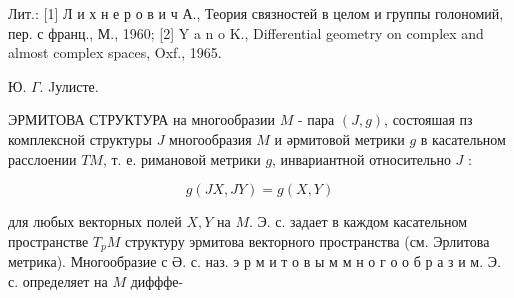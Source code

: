 \documentclass[10pt]{article}
\begin{document}
Лит.: [1] Л и х н е р о в и ч А., Теория связностей в целом и группы голономий, пер. с франц., М., 1960; [2] Y a n o K., Differential geometry on complex and almost complex spaces, Oxf., 1965.

Ю. $\Gamma$. Jулисте.



ЭРМИТОВА СТРУКТУРА на многообразии $M$ - пара $(J, g)$, состояшая пз комплексной структуры $J$ многообразия $M$ и әрмитовой метрики $g$ в касательном расслоении $T M$, т. е. римановой метрики $g$, инвариантной относительно $J$ :



\[

g(J X, J Y)=g(X, Y)

\]



для любых векторных полей $X, Y$ на $M$. Э. с. задает в каждом касательном пространстве $T_{p} M$ структуру эрмитова векторного пространства (см. Эрлитова метрика). Многообразие с Ә. с. наз. э р м и т о в ы м м н о г о о б р а з и м. Э. с. определяет на $M$ дифффе-
\end{document}
